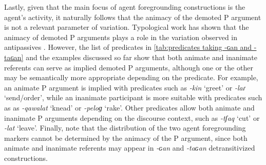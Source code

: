 \documentclass[12pt]{article}
\begin{document}
   Lastly, given that the main focus of agent foregrounding constructions is the agent’s activity, it naturally follows that the animacy of the demoted P argument is not a relevant parameter of variation. Typological work has shown that the animacy of demoted P arguments plays a role in the variation observed in antipassives  \citep{say2021,zuniga.kittila2019}. However, the list of predicates in \autoref{tab:predicates taking -ɢan and -taɢan} and the examples discussed so far show that both animate and inanimate referents can serve as implied demoted P arguments, although one or the other may be semantically more appropriate depending on the predicate. For example, an animate P argument is implied with predicates such as \textit{-kin} `greet' or \textit{-laɾ} `send/order', while an inanimate participant is more suitable with predicates such as as \textit{-qawalat} `knead' or \textit{-peloɡ} `rake'. Other predicates allow both animate and inanimate P arguments depending on the discourse context, such as \textit{-tʃaq} `cut' or \textit{-lat} `leave'. Finally, note that the distribution of the two agent foregrounding markers cannot be determined by the animacy of the P argument, since both animate and inanimate referents may appear in \textit{-ɢan} and \textit{-taɢan} detransitivized constructions.  





  
\end{document}
